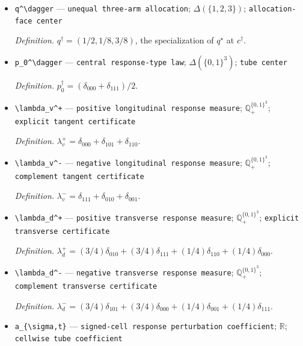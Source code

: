 \documentclass{article}
\begin{document}
\begin{itemize}
  \par\smallskip\noindent\emph{Definition.} \(d^\dagger=(0,3/4,-1/4)\), so \((c^\dagger)^\top d^\dagger=0\).
  \item \texttt{q\textasciicircum{}\textbackslash{}\allowbreak{}dagger} --- \texttt{unequal three-\allowbreak{}arm allocation}; \(\Delta(\{1,2,3\})\); \texttt{allocation-\allowbreak{}face center}
  \par\smallskip\noindent\emph{Definition.} \(q^\dagger=(1/2,1/8,3/8)\), the specialization of \(q^\star\) at \(c^\dagger\).
  \item \texttt{p\_\allowbreak{}0\textasciicircum{}\textbackslash{}\allowbreak{}dagger} --- \texttt{central response-\allowbreak{}type law}; \(\Delta(\{0,1\}^3)\); \texttt{tube center}
  \par\smallskip\noindent\emph{Definition.} \(p_0^\dagger=(\delta_{000}+\delta_{111})/2\).
  \item \texttt{\textbackslash{}\allowbreak{}lambda\_\allowbreak{}v\textasciicircum{}+\allowbreak{}} --- \texttt{positive longitudinal response measure}; \(\mathbb Q_+^{\{0,1\}^3}\); \texttt{explicit tangent certificate}
  \par\smallskip\noindent\emph{Definition.} \(\lambda_v^+=\delta_{000}+\delta_{101}+\delta_{110}\).
  \item \texttt{\textbackslash{}\allowbreak{}lambda\_\allowbreak{}v\textasciicircum{}-\allowbreak{}} --- \texttt{negative longitudinal response measure}; \(\mathbb Q_+^{\{0,1\}^3}\); \texttt{complement tangent certificate}
  \par\smallskip\noindent\emph{Definition.} \(\lambda_v^-=\delta_{111}+\delta_{010}+\delta_{001}\).
  \item \texttt{\textbackslash{}\allowbreak{}lambda\_\allowbreak{}d\textasciicircum{}+\allowbreak{}} --- \texttt{positive transverse response measure}; \(\mathbb Q_+^{\{0,1\}^3}\); \texttt{explicit transverse certificate}
  \par\smallskip\noindent\emph{Definition.} \(\lambda_d^+=(3/4)\delta_{010}+(3/4)\delta_{111}+(1/4)\delta_{110}+(1/4)\delta_{000}\).
  \item \texttt{\textbackslash{}\allowbreak{}lambda\_\allowbreak{}d\textasciicircum{}-\allowbreak{}} --- \texttt{negative transverse response measure}; \(\mathbb Q_+^{\{0,1\}^3}\); \texttt{complement transverse certificate}
  \par\smallskip\noindent\emph{Definition.} \(\lambda_d^-=(3/4)\delta_{101}+(3/4)\delta_{000}+(1/4)\delta_{001}+(1/4)\delta_{111}\).
  \item \texttt{a\_\allowbreak{}\{\textbackslash{}\allowbreak{}sigma,\allowbreak{}t\}\allowbreak{}} --- \texttt{signed-\allowbreak{}cell response perturbation coefficient}; \(\mathbb R\); \texttt{cellwise tube coefficient}

\end{itemize}
\end{document}
